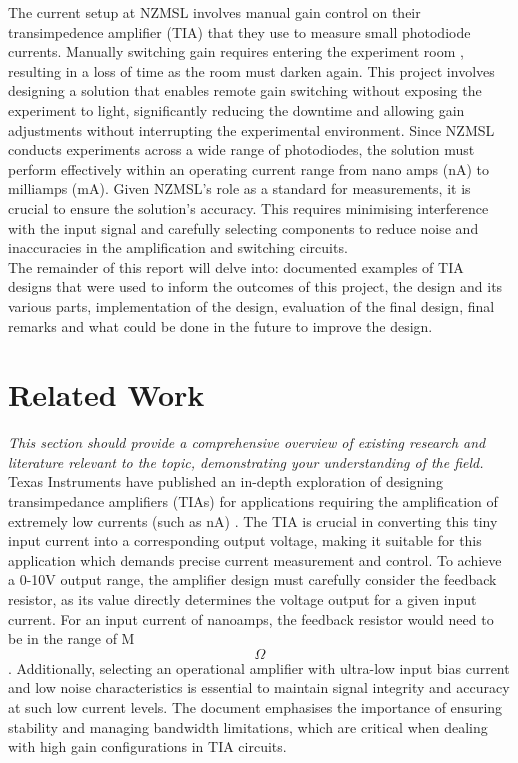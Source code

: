\documentclass[conference]{IEEEtran}
\begin{document}
The current setup at NZMSL involves manual gain control on their transimpedence amplifier (TIA) that they use to measure small photodiode currents. Manually switching gain requires entering the experiment room , resulting in a loss of time as the room must darken again. This project involves designing a solution that enables remote gain switching without exposing the experiment to light, significantly reducing the downtime and allowing gain adjustments without interrupting the experimental environment.
Since NZMSL conducts experiments across a wide range of photodiodes, the solution must perform effectively within an operating current range from nano amps (nA) to milliamps (mA). Given NZMSL's role as a standard for measurements, it is crucial to ensure the solution's accuracy. This requires minimising interference with the input signal and carefully selecting components to reduce noise and inaccuracies in the amplification and switching circuits. \\

The remainder of this report will delve into: documented examples of TIA designs that were used to inform the outcomes of this project, the design and its various parts, implementation of the design, evaluation of the final design, final remarks and what could be done in the future to improve the design.

\section{Related Work}

\textit{This section should provide a comprehensive overview of existing research and literature relevant to the topic, demonstrating your understanding of the field.} \\

Texas Instruments have published an in-depth exploration of designing transimpedance amplifiers (TIAs) for applications requiring the amplification of extremely low currents (such as nA) \cite{hashemi_2015}. The TIA is crucial in converting this tiny input current into a corresponding output voltage, making it suitable for this application which demands precise current measurement and control. To achieve a 0-10V output range, the amplifier design must carefully consider the feedback resistor, as its value directly determines the voltage output for a given input current. For an input current of nanoamps, the feedback resistor would need to be in the range of M$$\Omega$$. Additionally, selecting an operational amplifier with ultra-low input bias current and low noise characteristics is essential to maintain signal integrity and accuracy at such low current levels. The document emphasises the importance of ensuring stability and managing bandwidth limitations, which are critical when dealing with high gain configurations in TIA circuits.
\end{document}
